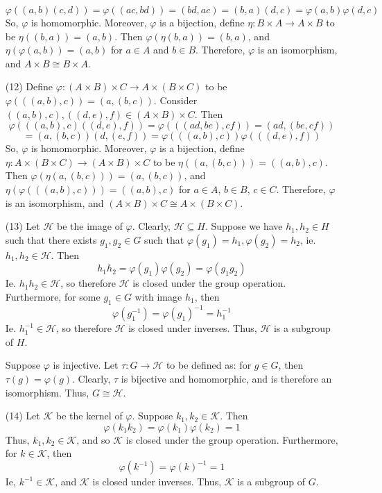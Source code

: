 \documentclass[12pt]{article}
\begin{document}
\begin{itemize}
$$\varphi((a, b)(c, d)) = \varphi((ac, bd)) = (bd, ac) = (b, a)(d, c) = \varphi(a, b)\varphi(d, c)$$
So, $\varphi$ is homomorphic. Moreover, $\varphi$ is a bijection, define $\eta: B \times A \rightarrow A \times B$ to be $\eta((b, a)) = (a, b)$. Then $\varphi(\eta(b, a)) = (b, a)$, and $\eta(\varphi(a, b)) = (a, b)$ for $a \in A$ and $b \in B$. Therefore, $\varphi$ is an isomorphism, and $A \times B \cong B \times A$. 
\item[(12)]
Define $\varphi: (A \times B) \times C \rightarrow A \times (B \times C)$ to be $\varphi(((a, b), c)) = (a, (b, c))$. Consider $((a, b), c), ((d, e), f) \in (A \times B) \times C$. Then
$$\varphi(((a, b), c)((d, e), f)) = \varphi(((ad, be), cf)) = (ad, (be, cf))$$
$$= (a, (b, c))(d, (e, f)) = \varphi(((a, b), c))\varphi(((d, e), f))$$
So, $\varphi$ is homomorphic. Moreover, $\varphi$ is a bijection, define $\eta: A \times (B \times C) \rightarrow (A \times B) \times C$ to be $\eta((a, (b, c))) = ((a, b), c)$. Then $\varphi(\eta(a, (b, c))) = (a, (b, c))$, and $\eta(\varphi(((a, b), c))) = ((a, b), c)$ for $a \in A$, $b \in B$, $c \in C$. Therefore, $\varphi$ is an isomorphism, and $(A \times B) \times C \cong A \times (B \times C)$.
\item[(13)]
Let $\mathcal{H}$ be the image of $\varphi$. Clearly, $\mathcal{H} \subseteq H$. Suppose we have $h_1, h_2 \in H$ such that there exists $g_1, g_2 \in G$ such that $\varphi(g_1) = h_1, \varphi(g_2) = h_2$, ie. $h_1, h_2 \in \mathcal{H}$. Then
$$h_1h_2 = \varphi(g_1)\varphi(g_2) = \varphi(g_1g_2)$$
Ie. $h_1h_2 \in\mathcal{H}$, so therefore $\mathcal{H}$ is closed under the group operation. Furthermore, for some $g_1 \in G$ with image $h_1$, then
$$\varphi(g_1^{-1}) = \varphi(g_1)^{-1} = h_1^{-1}$$
Ie. $h_1^{-1} \in \mathcal{H}$, so therefore $\mathcal{H}$ is closed under inverses. Thus, $\mathcal{H}$ is a subgroup of $H$.

Suppose $\varphi$ is injective. Let $\tau: G \rightarrow \mathcal{H}$ to be defined as: for $g \in G$, then $\tau(g) = \varphi(g)$. Clearly, $\tau$ is bijective and homomorphic, and is therefore an isomorphism. Thus, $G \cong \mathcal{H}$.
\item[(14)]
Let $\mathcal{K}$ be the kernel of $\varphi$. Suppose $k_1, k_2 \in \mathcal{K}$. Then 
$$\varphi(k_1k_2) = \varphi(k_1)\varphi(k_2) = 1$$
Thus, $k_1, k_2 \in \mathcal{K}$, and so $\mathcal{K}$ is closed under the group operation. Furthermore, for $k \in \mathcal{K}$, then
$$\varphi(k^{-1}) = \varphi(k)^{-1} = 1$$
Ie, $k^{-1} \in \mathcal{K}$, and $\mathcal{K}$ is closed under inverses. Thus, $\mathcal{K}$ is a subgroup of $G$.


\end{itemize}
\end{document}
